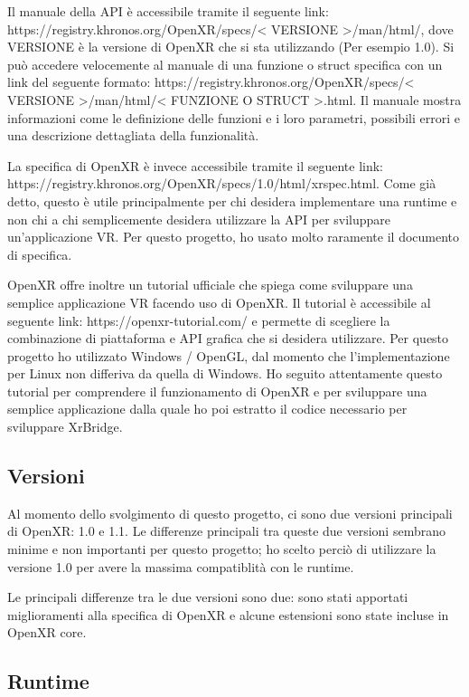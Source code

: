 \documentclass[twoside]{supsistudent}
\begin{document}
Il manuale della API è accessibile tramite il seguente link: https://registry.khronos.org/OpenXR/specs/< VERSIONE >/man/html/, dove VERSIONE è la versione di OpenXR che si sta utilizzando (Per esempio 1.0). Si può accedere velocemente al manuale di una funzione o struct specifica con un link del seguente formato: https://registry.khronos.org/OpenXR/specs/< VERSIONE >/man/html/< FUNZIONE O STRUCT >.html. Il manuale mostra informazioni come le definizione delle funzioni e i loro parametri, possibili errori e una descrizione dettagliata della funzionalità.

La specifica di OpenXR è invece accessibile tramite il seguente link: https://registry.khronos.org/OpenXR/specs/1.0/html/xrspec.html. Come già detto, questo è utile principalmente per chi desidera implementare una runtime e non chi a chi semplicemente desidera utilizzare la API per sviluppare un'applicazione VR. Per questo progetto, ho usato molto raramente il documento di specifica.

OpenXR offre inoltre un tutorial ufficiale che spiega come sviluppare una semplice applicazione VR facendo uso di OpenXR. Il tutorial è accessibile al seguente link: https://openxr-tutorial.com/ e permette di scegliere la combinazione di piattaforma e API grafica che si desidera utilizzare. Per questo progetto ho utilizzato Windows / OpenGL, dal momento che l'implementazione per Linux non differiva da quella di Windows. Ho seguito attentamente questo tutorial per comprendere il funzionamento di OpenXR e per sviluppare una semplice applicazione dalla quale ho poi estratto il codice necessario per sviluppare XrBridge.

\subsection{Versioni}

Al momento dello svolgimento di questo progetto, ci sono due versioni principali di OpenXR: 1.0 e 1.1. Le differenze principali tra queste due versioni sembrano minime e non importanti per questo progetto; ho scelto perciò di utilizzare la versione 1.0 per avere la massima compatiblità con le runtime.

Le principali differenze tra le due versioni sono due: sono stati apportati miglioramenti alla specifica di OpenXR e alcune estensioni sono state incluse in OpenXR core.

\subsection{Runtime}
\end{document}
